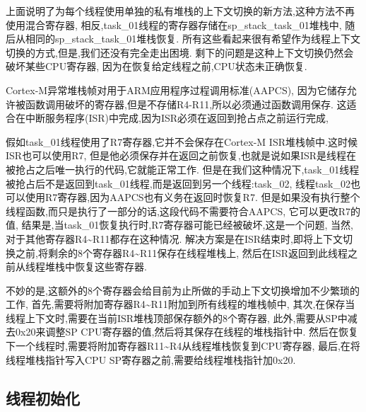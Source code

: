 上面说明了为每个线程使用单独的私有堆栈的上下文切换的新方法,这种方法不再使用混合寄存器,
相反,task\_01线程的寄存器存储在sp\_stack\_task\_01堆栈中,
随后从相同的sp\_stack\_task\_01堆栈恢复.
所有这些看起来很有希望作为线程上下文切换的方式,但是,我们还没有完全走出困境.
剩下的问题是这种上下文切换仍然会破坏某些CPU寄存器,
因为在恢复给定线程之前,CPU状态未正确恢复.

Cortex-M异常堆栈帧对用于ARM应用程序过程调用标准(AAPCS),
因为它储存允许被函数调用破坏的寄存器,但是不存储R4-R11,所以必须通过函数调用保存.
这适合在中断服务程序(ISR)中完成,因为ISR必须在返回到抢占点之前运行完成,

假如task\_01线程使用了R7寄存器,它并不会保存在Cortex-M ISR堆栈帧中.这时候ISR也可以使用R7,
但是他必须保存并在返回之前恢复,也就是说如果ISR是线程在被抢占之后唯一执行的代码,它就能正常工作.
但是在我们这种情况下,task\_01线程被抢占后不是返回到task\_01线程,而是返回到另一个线程:task\_02,
线程task\_02也可以使用R7寄存器,因为AAPCS也有义务在返回时恢复R7.
但是如果没有执行整个线程函数,而只是执行了一部分的话,这段代码不需要符合AAPCS,
它可以更改R7的值,
结果是,当task\_01恢复执行时,R7寄存器可能已经被破坏,这是一个问题,
当然,对于其他寄存器R4\textasciitilde R11都存在这种情况.
解决方案是在ISR结束时,即将上下文切换之前,将剩余的8个寄存器R4\textasciitilde R11保存在线程堆栈上,
然后在ISR返回到此线程之前从线程堆栈中恢复这些寄存器.

不妙的是,这额外的8个寄存器会给目前为止所做的手动上下文切换增加不少繁琐的工作,
首先,需要将附加寄存器R4\textasciitilde R11附加到所有线程的堆栈帧中,
其次,在保存当线程上下文时,需要在当前ISR堆栈顶部保存额外的8个寄存器,
此外,需要从SP中减去0x20来调整SP CPU寄存器的值,然后将其保存在线程的堆栈指针中.
然后在恢复下一个线程时,需要将附加寄存器R11\textasciitilde R4从线程堆栈恢复到CPU寄存器,
最后,在将线程堆栈指针写入CPU SP寄存器之前,需要给线程堆栈指针加0x20.


\subsection{线程初始化}

